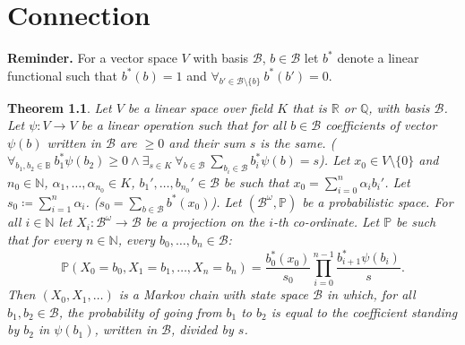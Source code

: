 \documentclass[a4paper, 12pt]{report}
\newtheorem{theorem}{Theorem}
\newcommand{\ndotsm}[3]{{#1}_{#2}, \dots, {#1}_{#3}}
\begin{document}
\chapter{Connection}
\textbf{Reminder. } For a vector space $V$ with basis $\mathcal{B}$,
$b \in \mathcal{B}$ let $b^*$
denote a linear functional such that $b^*(b) = 1$ and
$\forall_{b' \in \mathcal{B}\setminus \{b\}}\ b^*(b') = 0$.
\begin{theorem}
Let $V$ be a linear space over field $K$ that is $\mathbb{R}$ or $\mathbb{Q}$,
 with basis $\mathcal{B}$.
Let $\psi : V \to V$ be a linear operation such that for
all $b \in \mathcal{B}$ coefficients of vector $\psi(b)$ written in $\mathcal{B}$ are $\geq 0$ and their
sum $s$ is the same.
($\forall_{b_1, b_2 \in \mathbb{B}}\ b_1^*\psi(b_2) \geq 0 \land \exists_{s \in K}\ \forall_{b \in \mathcal{B}}\ \displaystyle\sum_{b_i \in \mathcal{B}}b_i^*\psi(b) = s$).
Let $x_0 \in V\setminus\{0\}$ and
$n_0 \in \mathbb{N}$, $\alpha_1, \dots, \alpha_{n_0} \in K$, $b_1', \dots, b_{n_0}' \in \mathcal{B}$
be such that $x_0 = \displaystyle\sum_{i = 0}^n \alpha_i b_i'$. Let $s_0 \coloneqq
\displaystyle\sum_{i = 1}^n \alpha_i$. ($s_0 = \displaystyle\sum_{b \in \mathcal{B}} b^*(x_0)$).
Let $(\mathcal{B}^\omega, \mathbb{P})$ be a probabilistic space. For all $i \in \mathbb{N}$ let
$X_i : \mathcal{B}^\omega \to \mathcal{B}$ be a projection on the $i$-th co-ordinate.
Let $\mathbb{P}$ be such that for every $n \in \mathbb{N}$, every
$\ndotsm{b}{0}{n} \in \mathcal{B}$:
\begin{equation*}
\mathbb{P}(X_0 = b_0, X_1 = b_1, \dots, X_n = b_n) =
\frac{b_0^*(x_0)}{s_0}\prod_{i = 0}^{n-1}\frac{b_{i+1}^*\psi(b_i)}{s}.
\end{equation*}
Then $(X_0, X_1, \dots)$ is a Markov chain with state space $\mathcal{B}$
in which, for all $b_1, b_2 \in \mathcal{B}$, the probability of going from $b_1$ to $b_2$ is equal to the
coefficient standing by $b_2$ in $\psi(b_1)$, written in $\mathcal{B}$, divided by $s$.
\end{theorem}
\end{document}
